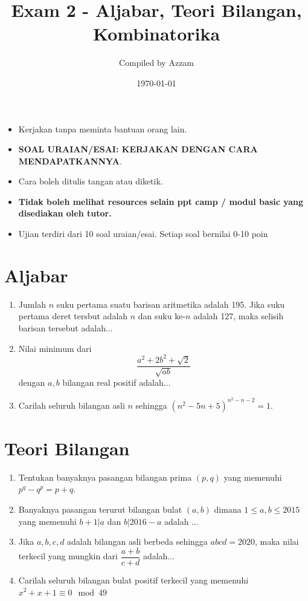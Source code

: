 \documentclass[12pt]{scrartcl}
\title{Exam 2 - Aljabar, Teori Bilangan, Kombinatorika} %
\date{\today}
\author{Compiled by Azzam}
\begin{document}
\maketitle
\begin{remark*}
    \begin{itemize}
    \item Kerjakan tanpa meminta bantuan orang lain.
    \item \textbf{SOAL URAIAN/ESAI: KERJAKAN DENGAN CARA MENDAPATKANNYA}.
    \item Cara boleh ditulis tangan atau diketik. 
    \item \textbf{Tidak boleh melihat resources selain ppt camp / modul basic yang disediakan oleh tutor.}
    \item Ujian terdiri dari 10 soal uraian/esai. Setiap soal bernilai 0-10 poin
    \end{itemize}
\end{remark*}
\section{Aljabar}
\begin{enumerate}
      \item Jumlah $n$ suku pertama suatu barisan aritmetika adalah 195. Jika suku pertama deret tersbut adalah $n$ dan suku ke-$n$ adalah 127, maka selisih barisan tersebut adalah...

      \item Nilai minimum dari $$\frac{a^2+2b^2+\sqrt{2}}{\sqrt{ab}}$$ dengan $a,b$ bilangan real positif adalah...

      \item Carilah seluruh bilangan asli $n$ sehingga $(n^2-5n+5)^{n^2-n-2}=1$.
\end{enumerate}

\section{Teori Bilangan}
\begin{enumerate}[resume]
    \item Tentukan banyaknya pasangan bilangan prima $(p,q)$ yang memenuhi $p^q-q^p = p+q$.

    \item Banyaknya pasangan terurut bilangan bulat $(a, b)$ dimana $1 \le a, b \le 2015$ yang memenuhi $b + 1|a$ dan $b|2016 - a$ adalah ...

    \item Jika $a,b,c,d$ adalah bilangan asli berbeda sehingga $abcd=2020$, maka nilai terkecil yang mungkin dari $\dfrac{a+b}{c+d}$ adalah...

    \item Carilah seluruh bilangan bulat positif terkecil yang memenuhi $x^2+x+1 \equiv 0 \mod 49$
\end{enumerate}
\end{document}
